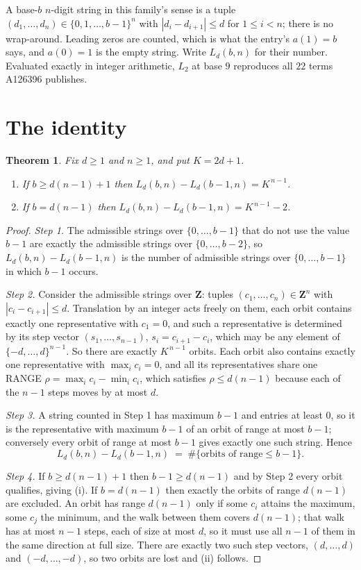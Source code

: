 \documentclass[11pt,a4paper]{article}
\theoremstyle{plain}
\newtheorem{theorem}{Theorem}
\theoremstyle{definition}
\begin{document}
A base-$b$ $n$-digit string in this family's sense is a tuple
$(d_1,\dots,d_n)\in\{0,1,\dots,b-1\}^{n}$ with $|d_i-d_{i+1}|\le d$ for $1\le i<n$; there
is no wrap-around. Leading zeros are counted, which is what the entry's $a(1)=b$ says, and
$a(0)=1$ is the empty string. Write $L_d(b,n)$ for their number. Evaluated exactly in integer
arithmetic, $L_{2}$ at base $9$ reproduces all $22$ terms A126396 publishes.

\section{The identity}

\begin{theorem}
Fix $d\ge1$ and $n\ge1$, and put $K=2d+1$.
\begin{enumerate}
\item[(i)] If $b\ge d(n-1)+1$ then $L_d(b,n)-L_d(b-1,n)=K^{\,n-1}$.
\item[(ii)] If $b=d(n-1)$ then $L_d(b,n)-L_d(b-1,n)=K^{\,n-1}-2$.
\end{enumerate}
\end{theorem}

\begin{proof}
\emph{Step 1.} The admissible strings over $\{0,\dots,b-1\}$ that do not use the value $b-1$
are exactly the admissible strings over $\{0,\dots,b-2\}$, so $L_d(b,n)-L_d(b-1,n)$ is the
number of admissible strings over $\{0,\dots,b-1\}$ in which $b-1$ occurs.

\emph{Step 2.} Consider the admissible strings over $\mathbf{Z}$: tuples
$(c_1,\dots,c_n)\in\mathbf{Z}^{n}$ with $|c_i-c_{i+1}|\le d$. Translation by an integer acts
freely on them, each orbit contains exactly one representative with $c_1=0$, and such a
representative is determined by its step vector $(s_1,\dots,s_{n-1})$, $s_i=c_{i+1}-c_i$,
which may be any element of $\{-d,\dots,d\}^{n-1}$. So there are exactly $K^{\,n-1}$ orbits.
Each orbit also contains exactly one representative with $\max_i c_i=0$, and all its
representatives share one RANGE $\rho=\max_ic_i-\min_ic_i$, which satisfies
$\rho\le d(n-1)$ because each of the $n-1$ steps moves by at most $d$.

\emph{Step 3.} A string counted in Step 1 has maximum $b-1$ and entries at least $0$, so it is
the representative with maximum $b-1$ of an orbit of range at most $b-1$; conversely every orbit
of range at most $b-1$ gives exactly one such string. Hence
\[
L_d(b,n)-L_d(b-1,n)\;=\;\#\{\text{orbits of range}\le b-1\} .
\]

\emph{Step 4.} If $b\ge d(n-1)+1$ then $b-1\ge d(n-1)$ and by Step 2 every orbit qualifies,
giving (i). If $b=d(n-1)$ then exactly the orbits of range $d(n-1)$ are excluded. An orbit has
range $d(n-1)$ only if some $c_i$ attains the maximum, some $c_j$ the minimum, and the walk
between them covers $d(n-1)$; that walk has at most $n-1$ steps, each of size at most $d$, so it
must use all $n-1$ of them in the same direction at full size. There are exactly two such step
vectors, $(d,\dots,d)$ and $(-d,\dots,-d)$, so two orbits are lost and (ii) follows.
\end{proof}
\end{document}
